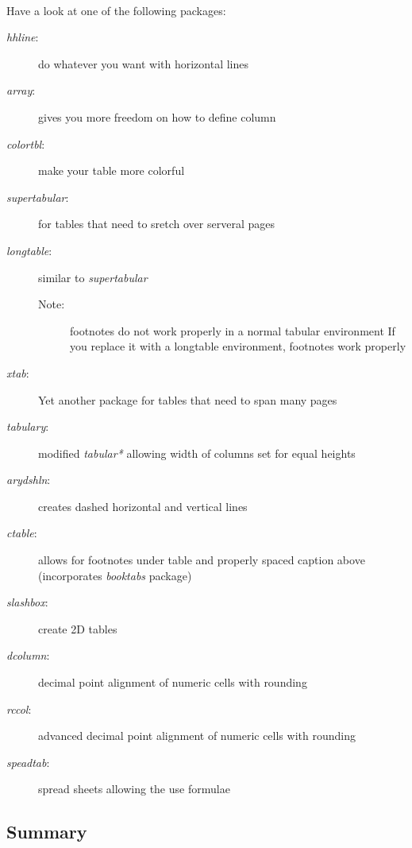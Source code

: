 \paragraph{}
Have a look at one of the following packages:
\begin{description}
	\item[\emph{hhline}:] do whatever you want with horizontal lines
	\item[\emph{array}:] gives you more freedom on how to define column
	\item[\emph{colortbl}:] make your table more colorful
	\item[\emph{supertabular}:] for tables that need to sretch over serveral pages
	\item[\emph{longtable}:] similar to \emph{supertabular} \hfill
		\begin{description}
			\item[Note:] footnotes do not work properly in a normal tabular environment
				If you replace it with a longtable environment, footnotes work properly
		\end{description}
	\item[\emph{xtab}:] Yet another package for tables that need to span many pages
	\item[\emph{tabulary}:] modified \emph{tabular*} allowing width of columns set for equal heights
	\item[\emph{arydshln}:] creates dashed horizontal and vertical lines
	\item[\emph{ctable}:] allows for footnotes under table and properly spaced caption above (incorporates \emph{booktabs} package)
	\item[\emph{slashbox}:] create 2D tables
	\item[\emph{dcolumn}:] decimal point alignment of numeric cells with rounding
	\item[\emph{rccol}:] advanced decimal point alignment of numeric cells with rounding
	\item[\emph{speadtab}:] spread sheets allowing the use formulae
\end{description}
\subsection{Summary}









